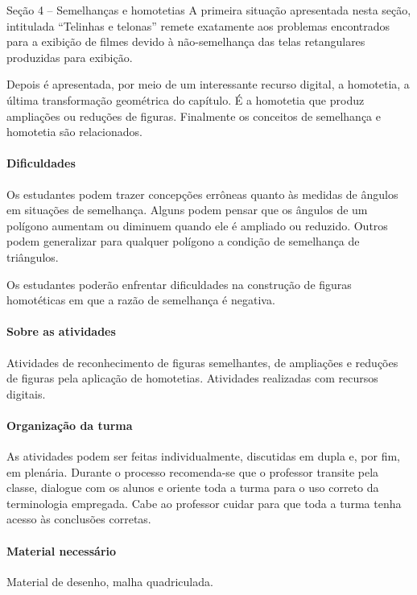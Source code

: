 \begin{paginatexto}{Seção 4 -- Semelhanças e homotetias}
A primeira situação apresentada nesta seção, intitulada “Telinhas e telonas” remete exatamente aos problemas encontrados para a exibição de filmes devido à não-semelhança das telas retangulares produzidas para exibição.
 
Depois é apresentada, por meio de um interessante recurso digital, a homotetia, a última transformação geométrica do capítulo.  É a homotetia que produz ampliações ou reduções de figuras. Finalmente os conceitos de semelhança e homotetia são relacionados.


\paragraph{Dificuldades}
Os estudantes podem trazer concepções errôneas quanto às medidas de ângulos em situações de semelhança. Alguns podem pensar que os ângulos de um polígono aumentam ou diminuem quando ele é ampliado ou reduzido. Outros podem generalizar para qualquer polígono a condição de semelhança de triângulos.

Os estudantes poderão enfrentar dificuldades na construção de figuras homotéticas em que a razão de semelhança é negativa.

\paragraph{Sobre as atividades}
Atividades de reconhecimento de figuras semelhantes, de ampliações e reduções de figuras pela aplicação de homotetias. Atividades realizadas com recursos digitais. 

\paragraph{Organização da turma}
As atividades podem ser feitas individualmente, discutidas em dupla e, por fim, em plenária. Durante o processo recomenda-se que o professor transite pela classe, dialogue com os alunos e oriente toda a turma para o uso correto da terminologia empregada. Cabe ao professor cuidar para que toda a turma tenha acesso às conclusões corretas.

\paragraph{Material necessário}
Material de desenho, malha quadriculada.

\end{paginatexto}

\clearmargin

